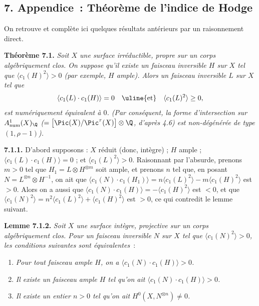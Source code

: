 
\subsection*{7. Appendice~: Th\'eor\`eme de l'indice de Hodge}

On retrouve et compl\`ete ici quelques r\'esultats ant\'erieurs par un raisonnement direct.

\textbf{Th\'eor\`eme 7.1.} \emph{Soit $X$ une surface irr\'eductible, propre sur un corps alg\'ebriquement clos. On suppose qu'il existe un faisceau inversible $H$ sur $X$ tel que $\langle c_1(H)^2\rangle>0$ (par exemple, $H$ ample). Alors un faisceau inversible $L$ sur $X$ tel que}
\[
   \langle c_1(L)\cdot c_1(H)\rangle=0
   \quad\hbox{\uline{et}}\quad
   \langle c_1(L)^2\rangle\geq 0,
\]
\emph{est num\'eriquement \'equivalent \`a $0$. (Par cons\'equent, la forme d'intersection sur $A^1_{\mathrm{num}}(X)_{\Q}$ ($=\bigl[\Pic(X)/\Pic^\tau(X)\bigr]\otimes\Q$, d'apr\`es 4.6) est non-d\'eg\'en\'er\'ee de type $(1,\rho-1)$).}

\textbf{7.1.1.} D'abord supposons : $X$ r\'eduit (donc, int\`egre) ; $H$ ample ; $\langle c_1(L)\cdot c_1(H)\rangle=0$ ; et $\langle c_1(L)^2\rangle>0$. Raisonnant par l'absurde, prenons $m>0$ tel que $H_1=L\otimes H^{\otimes m}$ soit ample, et prenons $n$ tel que, en posant $N=L^{\otimes n}\otimes H^{-1}$, on ait que $\langle c_1(N)\cdot c_1(H_1)\rangle=n\langle c_1(L)^2\rangle-m\langle c_1(H)^2\rangle$ est $>0$. Alors on a aussi que $\langle c_1(N)\cdot c_1(H)\rangle=-\langle c_1(H)^2\rangle$ est $<0$, et que $\langle c_1(N)^2\rangle=n^2\langle c_1(L)^2\rangle+\langle c_1(H)^2\rangle$ est $>0$, ce qui contredit le lemme suivant.

\textbf{Lemme 7.1.2.} \emph{Soit $X$ une surface int\`egre, projective sur un corps alg\'ebriquement clos. Pour un faisceau inversible $N$ sur $X$ tel que $\langle c_1(N)^2\rangle>0$, les conditions suivantes sont \'equivalentes}~:
\begin{enumerate}[label=(\roman*)]
\item \emph{Pour tout faisceau ample $H$, on a $\langle c_1(N)\cdot c_1(H)\rangle>0$.}
\item[(i')] \emph{Il existe un faisceau ample $H$ tel qu'on ait $\langle c_1(N)\cdot c_1(H)\rangle>0$.}
\item \emph{Il existe un entier $n>0$ tel qu'on ait $H^0(X,N^{\otimes n})\ne0$.}
\end{enumerate}

